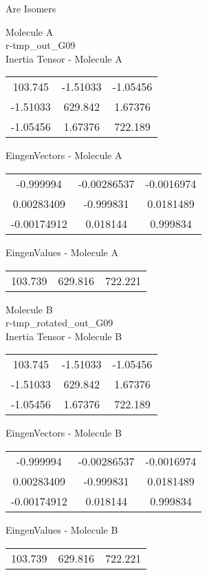 \begin{center}
\vtab
\vtab
\textcolor{NavyBlue}{\Large Are Isomers}
\end{center}
\newpage
\begin{multicols}{2}
\begin{center}
Molecule A \\ 
r-tmp\_out\_G09
\\
Inertia Tensor - Molecule A \\
\vtab
\begin{tabular}{|c c c|}
103.745	 & 	-1.51033	 & 	-1.05456	 \\
-1.51033	 & 	629.842	 & 	1.67376	 \\
-1.05456	 & 	1.67376	 & 	722.189
\end{tabular}

\vtab
 EingenVectors - Molecule A     \\
\vtab
\begin{tabular}{|c c c|}
-0.999994	 & 	-0.00286537	 & 	-0.0016974	 \\
0.00283409	 & 	-0.999831	 & 	0.0181489	 \\
-0.00174912	 & 	0.018144	 & 	0.999834
\end{tabular}

\vtab
 EingenValues - Molecule A     \\
\vtab
\begin{tabular}{|c c c|}
103.739	 & 	629.816	 & 	722.221
\end{tabular}
\columnbreak

Molecule B \\ 
r-tmp\_rotated\_out\_G09
\\
Inertia Tensor - Molecule B \\
\vtab
\begin{tabular}{|c c c|}
103.745	 & 	-1.51033	 & 	-1.05456	 \\
-1.51033	 & 	629.842	 & 	1.67376	 \\
-1.05456	 & 	1.67376	 & 	722.189
\end{tabular}

\vtab
 EingenVectors - Molecule B     \\
\vtab
\begin{tabular}{|c c c|}
-0.999994	 & 	-0.00286537	 & 	-0.0016974	 \\
0.00283409	 & 	-0.999831	 & 	0.0181489	 \\
-0.00174912	 & 	0.018144	 & 	0.999834
\end{tabular}

\vtab
 EingenValues - Molecule B     \\
\vtab
\begin{tabular}{|c c c|}
103.739	 & 	629.816	 & 	722.221
\end{tabular}

\end{center}
\end{multicols}
